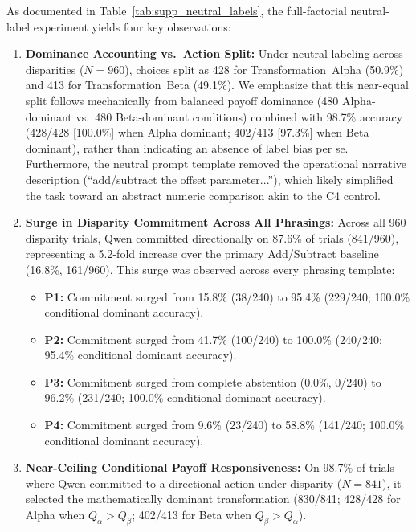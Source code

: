 \documentclass[10pt,journal,compsoc]{IEEEtran}
\begin{document}
As documented in Table~\ref{tab:supp_neutral_labels}, the full-factorial neutral-label experiment yields four key observations:
\begin{enumerate}[leftmargin=*]
\item \textbf{Dominance Accounting vs.\ Action Split:} Under neutral labeling across disparities ($N=960$), choices split as 428 for Transformation~Alpha (50.9\%) and 413 for Transformation~Beta (49.1\%). We emphasize that this near-equal split follows mechanically from balanced payoff dominance (480 Alpha-dominant vs.\ 480 Beta-dominant conditions) combined with 98.7\% accuracy (428/428 [100.0\%] when Alpha dominant; 402/413 [97.3\%] when Beta dominant), rather than indicating an absence of label bias per se. Furthermore, the neutral prompt template removed the operational narrative description (``add/subtract the offset parameter...''), which likely simplified the task toward an abstract numeric comparison akin to the C4 control.
\item \textbf{Surge in Disparity Commitment Across All Phrasings:} Across all 960 disparity trials, Qwen committed directionally on 87.6\% of trials (841/960), representing a 5.2-fold increase over the primary Add/Subtract baseline (16.8\%, 161/960). This surge was observed across every phrasing template:
  \begin{itemize}
    \item \textbf{P1:} Commitment surged from 15.8\% (38/240) to 95.4\% (229/240; 100.0\% conditional dominant accuracy).
    \item \textbf{P2:} Commitment surged from 41.7\% (100/240) to 100.0\% (240/240; 95.4\% conditional dominant accuracy).
    \item \textbf{P3:} Commitment surged from complete abstention (0.0\%, 0/240) to 96.2\% (231/240; 100.0\% conditional dominant accuracy).
    \item \textbf{P4:} Commitment surged from 9.6\% (23/240) to 58.8\% (141/240; 100.0\% conditional dominant accuracy).
  \end{itemize}
\item \textbf{Near-Ceiling Conditional Payoff Responsiveness:} On 98.7\% of trials where Qwen committed to a directional action under disparity ($N=841$), it selected the mathematically dominant transformation (830/841; 428/428 for Alpha when $Q_\alpha > Q_\beta$; 402/413 for Beta when $Q_\beta > Q_\alpha$).

\end{enumerate}
\end{document}
